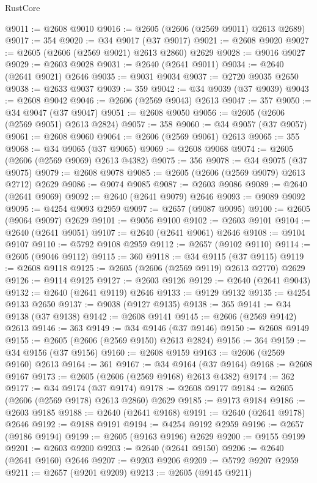 \begin{lexlean}{RustCore}
\begin{coremodule}
@9011 := @2608 @9010
@9016 := @2605 (@2606 (@2569 @9011) @2613 @2689)
@9017 := 354
@9020 := @34 @9017 (@37 @9017)
@9021 := @2608 @9020
@9027 := @2605 (@2606 (@2569 @9021) @2613 @2860) @2629
@9028 := @9016 @9027
@9029 := @2603 @9028
@9031 := @2640 (@2641 @9011)
@9034 := @2640 (@2641 @9021) @2646
@9035 := @9031 @9034
@9037 := @2720 @9035 @2650
@9038 := @2633 @9037
@9039 := 359
@9042 := @34 @9039 (@37 @9039)
@9043 := @2608 @9042
@9046 := @2606 (@2569 @9043) @2613
@9047 := 357
@9050 := @34 @9047 (@37 @9047)
@9051 := @2608 @9050
@9056 := @2605 (@2606 (@2569 @9051) @2613 @2824)
@9057 := 358
@9060 := @34 @9057 (@37 @9057)
@9061 := @2608 @9060
@9064 := @2606 (@2569 @9061) @2613
@9065 := 355
@9068 := @34 @9065 (@37 @9065)
@9069 := @2608 @9068
@9074 := @2605 (@2606 (@2569 @9069) @2613 @4382)
@9075 := 356
@9078 := @34 @9075 (@37 @9075)
@9079 := @2608 @9078
@9085 := @2605 (@2606 (@2569 @9079) @2613 @2712) @2629
@9086 := @9074 @9085
@9087 := @2603 @9086
@9089 := @2640 (@2641 @9069)
@9092 := @2640 (@2641 @9079) @2646
@9093 := @9089 @9092
@9095 := @4254 @9093 @2959
@9097 := @2657 (@9087 @9095)
@9100 := @2605 (@9064 @9097) @2629
@9101 := @9056 @9100
@9102 := @2603 @9101
@9104 := @2640 (@2641 @9051)
@9107 := @2640 (@2641 @9061) @2646
@9108 := @9104 @9107
@9110 := @5792 @9108 @2959
@9112 := @2657 (@9102 @9110)
@9114 := @2605 (@9046 @9112)
@9115 := 360
@9118 := @34 @9115 (@37 @9115)
@9119 := @2608 @9118
@9125 := @2605 (@2606 (@2569 @9119) @2613 @2770) @2629
@9126 := @9114 @9125
@9127 := @2603 @9126
@9129 := @2640 (@2641 @9043)
@9132 := @2640 (@2641 @9119) @2646
@9133 := @9129 @9132
@9135 := @4254 @9133 @2650
@9137 := @9038 (@9127 @9135)
@9138 := 365
@9141 := @34 @9138 (@37 @9138)
@9142 := @2608 @9141
@9145 := @2606 (@2569 @9142) @2613
@9146 := 363
@9149 := @34 @9146 (@37 @9146)
@9150 := @2608 @9149
@9155 := @2605 (@2606 (@2569 @9150) @2613 @2824)
@9156 := 364
@9159 := @34 @9156 (@37 @9156)
@9160 := @2608 @9159
@9163 := @2606 (@2569 @9160) @2613
@9164 := 361
@9167 := @34 @9164 (@37 @9164)
@9168 := @2608 @9167
@9173 := @2605 (@2606 (@2569 @9168) @2613 @4382)
@9174 := 362
@9177 := @34 @9174 (@37 @9174)
@9178 := @2608 @9177
@9184 := @2605 (@2606 (@2569 @9178) @2613 @2860) @2629
@9185 := @9173 @9184
@9186 := @2603 @9185
@9188 := @2640 (@2641 @9168)
@9191 := @2640 (@2641 @9178) @2646
@9192 := @9188 @9191
@9194 := @4254 @9192 @2959
@9196 := @2657 (@9186 @9194)
@9199 := @2605 (@9163 @9196) @2629
@9200 := @9155 @9199
@9201 := @2603 @9200
@9203 := @2640 (@2641 @9150)
@9206 := @2640 (@2641 @9160) @2646
@9207 := @9203 @9206
@9209 := @5792 @9207 @2959
@9211 := @2657 (@9201 @9209)
@9213 := @2605 (@9145 @9211)

\end{coremodule}
\end{lexlean}
